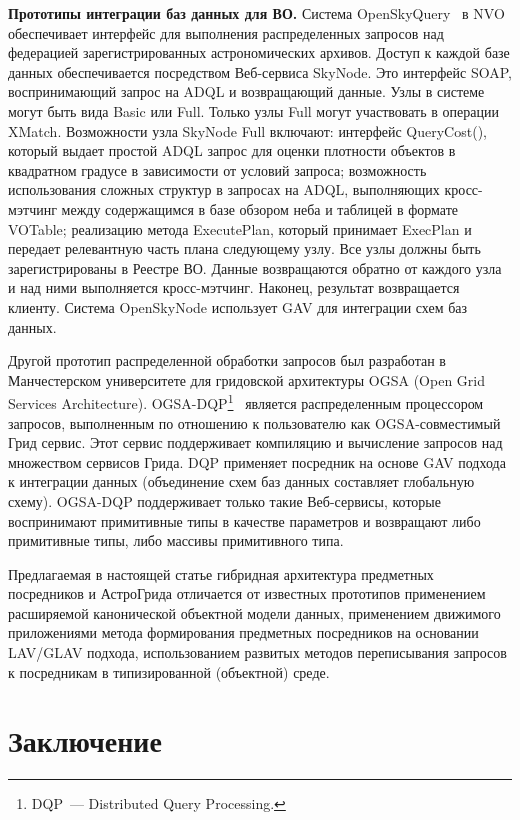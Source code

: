 \begin{multicols}{2}
\noindent
\textbf{Прототипы интеграции баз данных для ВО.} Сис\-те\-ма
OpenSkyQuery~\cite{SkyQ} в NVO~\cite{Hanisch} обеспечивает интерфейс для
выполнения распределенных запросов над федерацией зарегистрированных
астрономических архивов. Доступ к каждой базе данных обеспечивается посредством
Веб-сервиса SkyNode. Это интерфейс SOAP, воспринимающий запрос на ADQL и
возвращающий данные. Узлы в системе могут быть вида Basic или Full. Только узлы Full
могут участвовать в операции XMatch. Возможности узла SkyNode Full включают:
интерфейс QueryCost(), который выдает простой ADQL запрос для оценки плотности
объектов в квадратном градусе в зависимости от условий запроса; возможность
использования сложных структур в запросах на ADQL, выполняющих кросс-мэтчинг
между содержащимся в базе обзором неба и таблицей в формате VOTable; реализацию
метода ExecutePlan, который принимает ExecPlan и передает релевантную часть плана
следующему узлу. Все узлы должны быть зарегистрированы в Реестре ВО. Данные
возвращаются обратно от каждого узла и над ними выполняется кросс-мэтчинг. Наконец,
результат возвращается клиенту. Система OpenSkyNode использует GAV для интеграции
схем баз данных.

     Другой прототип распределенной обработки %
     запросов был разработан в
Манчестерском университете для гридовской архитектуры OGSA %
 (Open Grid Services
Architecture).
OGSA-DQP\footnote{DQP~--- Distributed Query Processing.}~\cite{Apd04} яв\-ля\-ется распределенным процессором запросов,
выполненным по отношению к пользователю как OGSA-со\-вмес\-ти\-мый Грид сервис. Этот
сервис поддерживает компиляцию и вычисление запросов над множеством сервисов
Грида. DQP применяет посредник на основе GAV подхода к интеграции данных
(объединение схем баз данных составляет глобальную схему). OGSA-DQP поддерживает
только такие Веб-сер\-ви\-сы, которые воспринимают примитивные типы в качестве
параметров и возвращают либо примитивные типы, либо массивы примитивного типа.

     Предлагаемая в настоящей статье гибридная архитектура предметных посредников и
АстроГрида отличается от известных прототипов применением расширяемой
канонической объектной модели данных, применением движимого приложениями метода
формирования предметных посредников на основании LAV/GLAV подхода,
использованием развитых методов переписывания запросов к посредникам в
типизированной (объектной) среде.


\section{Заключение}


\end{multicols}
